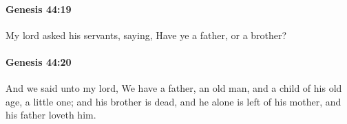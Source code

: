 		\paragraph{Genesis 44:19} %
			\label{GENESIS-44-19}

			My lord asked his servants, saying, Have ye a father, or a brother?


		\paragraph{Genesis 44:20} %
			\label{GENESIS-44-20}

			And we said unto my lord, We have a father, an old man, and a child of his old age, a little one; and his brother is dead, and he alone is left of his mother, and his father loveth him.


